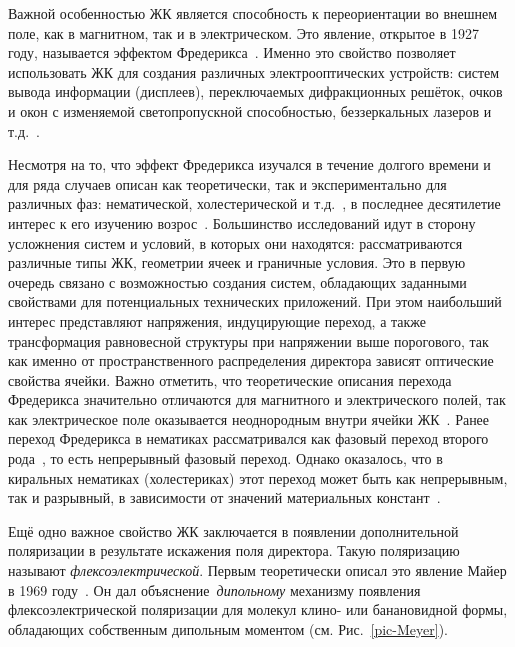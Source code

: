 Важной особенностью ЖК является способность к переориентации во внешнем поле, как в магнитном, так и в электрическом.
Это явление, открытое в 1927 году, называется эффектом Фредерикса~\autocite{Fred1927,Fred1933}.
Именно это свойство позволяет использовать ЖК для создания различных электрооптических устройств: систем вывода информации (дисплеев), переключаемых дифракционных решёток, очков и окон с изменяемой светопропускной способностью, беззеркальных лазеров и т.д.~\cite{Blinov1994, McManamon1996, Taheri2000, F.2001, Schmidtke2003, Senyuk2005, Jiang2019}.

Несмотря на то, что эффект Фредерикса изучался в течение долгого времени и для ряда случаев описан как теоретически, так и экспериментально для различных фаз: нематической, холестерической и т.д.~\cite{pikin, deGennesbook1995, stewartBook}, в последнее десятилетие интерес к его изучению возрос~\cite{Brown2003, Brown2007, Makarov2010, Garbovskiy2017, dosSantos2019, Begum2020}.
Большинство исследований идут в сторону усложнения систем и условий, в которых они находятся: рассматриваются различные типы ЖК, геометрии ячеек и граничные условия.
Это в первую очередь связано с возможностью создания систем, обладающих заданными свойствами для потенциальных технических приложений.
При этом наибольший интерес представляют напряжения, индуцирующие переход, а также трансформация равновесной структуры при напряжении выше порогового, так как именно от пространственного распределения директора зависят оптические свойства ячейки.
Важно отметить, что теоретические описания перехода Фредерикса значительно отличаются для магнитного и электрического полей, так как электрическое поле оказывается неоднородным внутри ячейки ЖК~\autocite{Deuling,NonHomoElectricField1972,CTBerr,Arakelyan1984,Napoli2006}.
Ранее переход Фредерикса в нематиках рассматривался как фазовый переход второго рода~\autocite{Guyon1975}, то есть непрерывный фазовый переход.
Однако оказалось, что в киральных нематиках (холестериках) этот переход может быть как непрерывным, так и разрывный, в зависимости от значений материальных констант~\autocite{VAR2013}.

Ещё одно важное свойство ЖК заключается в появлении дополнительной поляризации в результате искажения поля директора.
Такую поляризацию называют \textit{флексоэлектрической}.
Первым теоретически описал это явление Майер в 1969 году~\cite{Meyer1969}.
Он дал объяснение~\textit{дипольному} механизму появления флексоэлектрической поляризации для молекул клино- или банановидной формы, обладающих собственным дипольным моментом (см. Рис.~\ref{pic-Meyer}). 

